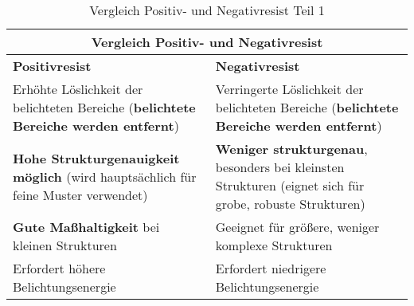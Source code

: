 \documentclass{article} %
\begin{document}
\begin{table}[htb!]
    \centering
    \renewcommand{\arraystretch}{1.5} %
    \begin{tabular}{|p{6cm}|p{6cm}|}
        \hline
        \multicolumn{2}{|c|}{\textbf{Vergleich Positiv- und Negativresist}} \\ \hline
        \textbf{Positivresist} & \textbf{Negativresist} \\ \hline
        Erhöhte Löslichkeit der belichteten Bereiche (\textbf{belichtete Bereiche werden entfernt}) & Verringerte Löslichkeit der belichteten Bereiche (\textbf{belichtete Bereiche werden entfernt}) \\
        \textbf{Hohe Strukturgenauigkeit möglich} (wird hauptsächlich für feine Muster verwendet) & \textbf{Weniger strukturgenau}, besonders bei kleinsten Strukturen (eignet sich für grobe, robuste Strukturen) \\
        \textbf{Gute Maßhaltigkeit} bei kleinen Strukturen & Geeignet für größere, weniger komplexe Strukturen \\
        Erfordert höhere Belichtungsenergie & Erfordert niedrigere Belichtungsenergie \\ \hline
    \end{tabular}
    \captionsetup{labelfont=bf} %
    \caption{Vergleich Positiv- und Negativresist Teil 1 \cite{madou2002, wolf2000}}
    \label{tab:Vergleich Positiv- und Negativresist Teil 1}
\end{table}
\end{document}
